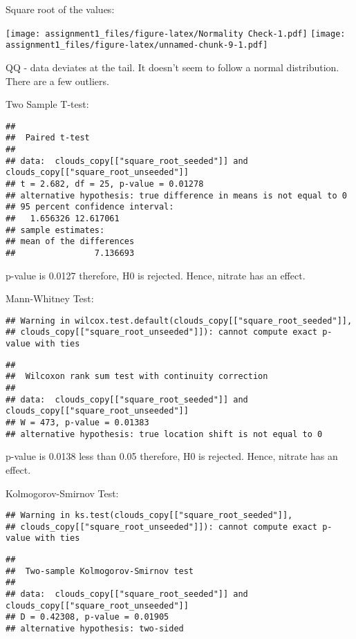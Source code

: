 \documentclass[
]{article}
\begin{document}
Square root of the values:

\texttt{[image: assignment1\_files/figure-latex/Normality Check-1.pdf]}
\texttt{[image: assignment1\_files/figure-latex/unnamed-chunk-9-1.pdf]}

QQ - data deviates at the tail. It doesn't seem to follow a normal
distribution. There are a few outliers.

Two Sample T-test:

\begin{verbatim}
## 
##  Paired t-test
## 
## data:  clouds_copy[["square_root_seeded"]] and clouds_copy[["square_root_unseeded"]]
## t = 2.682, df = 25, p-value = 0.01278
## alternative hypothesis: true difference in means is not equal to 0
## 95 percent confidence interval:
##   1.656326 12.617061
## sample estimates:
## mean of the differences 
##                7.136693
\end{verbatim}

p-value is 0.0127 therefore, H0 is rejected. Hence, nitrate has an
effect.

Mann-Whitney Test:

\begin{verbatim}
## Warning in wilcox.test.default(clouds_copy[["square_root_seeded"]],
## clouds_copy[["square_root_unseeded"]]): cannot compute exact p-value with ties
\end{verbatim}

\begin{verbatim}
## 
##  Wilcoxon rank sum test with continuity correction
## 
## data:  clouds_copy[["square_root_seeded"]] and clouds_copy[["square_root_unseeded"]]
## W = 473, p-value = 0.01383
## alternative hypothesis: true location shift is not equal to 0
\end{verbatim}

p-value is 0.0138 less than 0.05 therefore, H0 is rejected. Hence,
nitrate has an effect.

Kolmogorov-Smirnov Test:

\begin{verbatim}
## Warning in ks.test(clouds_copy[["square_root_seeded"]],
## clouds_copy[["square_root_unseeded"]]): cannot compute exact p-value with ties
\end{verbatim}

\begin{verbatim}
## 
##  Two-sample Kolmogorov-Smirnov test
## 
## data:  clouds_copy[["square_root_seeded"]] and clouds_copy[["square_root_unseeded"]]
## D = 0.42308, p-value = 0.01905
## alternative hypothesis: two-sided
\end{verbatim}
\end{document}

